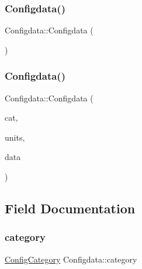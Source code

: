 \subsubsection{\texorpdfstring{Configdata()}{Configdata()}\hspace{0.1cm}{\footnotesize\ttfamily [1/2]}}
{\footnotesize\ttfamily Configdata\+::\+Configdata (\begin{DoxyParamCaption}{ }\end{DoxyParamCaption})\hspace{0.3cm}{\ttfamily [inline]}}

\hypertarget{struct_configdata_a573adee7ab056c69b257686c945f6eba}{}\label{struct_configdata_a573adee7ab056c69b257686c945f6eba} 
\subsubsection{\texorpdfstring{Configdata()}{Configdata()}\hspace{0.1cm}{\footnotesize\ttfamily [2/2]}}
{\footnotesize\ttfamily Configdata\+::\+Configdata (\begin{DoxyParamCaption}\item[{\hyperlink{_sim_data_structs_8h_a32f23b552ade08d96d49cc3061a27165}{Config\+Category}}]{cat,  }\item[{std\+::string}]{units,  }\item[{std\+::string}]{data }\end{DoxyParamCaption})\hspace{0.3cm}{\ttfamily [inline]}}



\subsection{Field Documentation}
\hypertarget{struct_configdata_a1daa0b904ee36697035bb1b251735b86}{}\label{struct_configdata_a1daa0b904ee36697035bb1b251735b86} 
\subsubsection{\texorpdfstring{category}{category}}
{\footnotesize\ttfamily \hyperlink{_sim_data_structs_8h_a32f23b552ade08d96d49cc3061a27165}{Config\+Category} Configdata\+::category}

\hypertarget{struct_configdata_a073f302b2e65d70ca077fc3bb5e7a090}{}\label{struct_configdata_a073f302b2e65d70ca077fc3bb5e7a090} 

